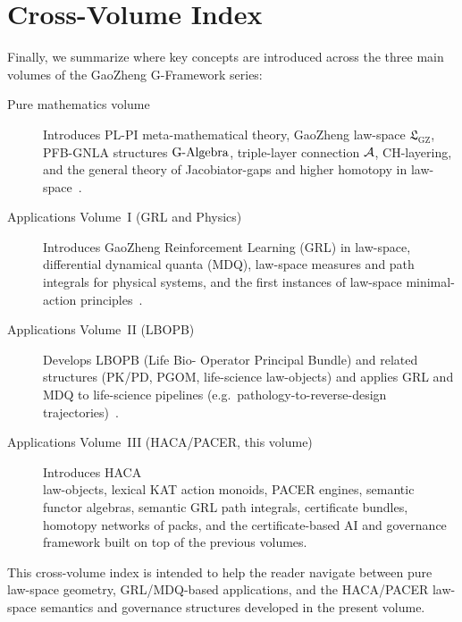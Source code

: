 \documentclass[11pt]{book}
\theoremstyle{plain}
\theoremstyle{definition}
\theoremstyle{remark}
\newcommand{\GZLS}{\ensuremath{\mathfrak{L}_{\mathrm{GZ}}}}       \newcommand{\GZLT}{\ensuremath{M_{!w}}}                           \newcommand{\GZLOC}{\ensuremath{A_M}}                             \newcommand{\GZLC}{\ensuremath{\omega_{\mathrm{law}}}}            \newcommand{\GZLCurv}{\ensuremath{\mathcal{F}_{\mathrm{law}}}}
\begin{document}
\section*{Cross-Volume Index}

Finally, we summarize where key concepts are introduced across the
three main volumes of the GaoZheng G-Framework series:

\begin{description}
  \item[Pure mathematics volume] Introduces PL-PI meta-mathematical
        theory, GaoZheng law-space $\GZLS$, PFB-GNLA structures
        $\text{G-Algebra}$, triple-layer connection $\mathcal{A}$, CH-layering,
        and the general theory of Jacobiator-gaps and higher homotopy
        in law-space~\cite{GaoZheng2025GFramework}.
  \item[Applications Volume~I (GRL and Physics)] Introduces GaoZheng
        Reinforcement Learning (GRL) in law-space, differential
        dynamical quanta (MDQ), law-space measures and path integrals
        for physical systems, and the first instances of law-space
        minimal-action principles~\cite{GaoZhengAppVol1}.
  \item[Applications Volume~II (LBOPB)] Develops LBOPB (Life Bio-
        Operator Principal Bundle) and related structures (PK/PD,
        PGOM, life-science law-objects) and applies GRL and MDQ to
        life-science pipelines (e.g.\ pathology-to-reverse-design
        trajectories)~\cite{GaoZhengAppVol2}.
  \item[Applications Volume~III (HACA/PACER, this volume)] Introduces
        HACA \\law-objects, lexical KAT action monoids, PACER engines,
        semantic functor algebras, semantic GRL path integrals,
        certificate bundles, homotopy networks of packs, and the
        certificate-based AI and governance framework built on top of
        the previous volumes.
\end{description}

This cross-volume index is intended to help the reader navigate
between pure law-space geometry, GRL/MDQ-based applications, and the
HACA/PACER law-space semantics and governance structures developed in
the present volume.

\clearpage
\end{document}

